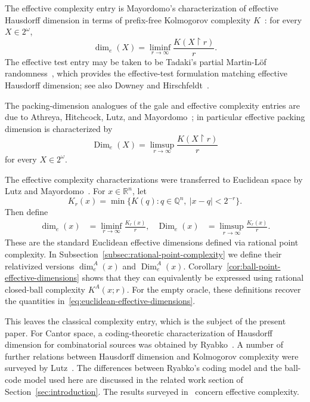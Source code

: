 \documentclass[a4paper,oneside,reqno,12pt]{amsart}
\theoremstyle{plain}
\theoremstyle{definition}
\theoremstyle{remark}
\DeclareMathOperator{\Dim}{Dim}
\begin{document}
The
effective complexity entry is Mayordomo's characterization of effective
Hausdorff dimension in terms of prefix-free Kolmogorov complexity \(K\)~\cite{Mayordomo2002}:
for every \(X\in2^\omega\),
\[
\dim_e(X)
=
\liminf_{r\to\infty}\frac{K(X\upharpoonright r)}{r}.
\]
The effective test entry may be taken to be Tadaki's partial Martin-L\"of
randomness~\cite{Tadaki2002}, which provides the effective-test formulation
matching effective Hausdorff dimension; see also Downey and
Hirschfeldt~\cite[Proposition~13.5.3]{DowneyHirschfeldt2010}.

The
packing-dimension analogues of the gale and effective complexity entries are
due to Athreya, Hitchcock, Lutz, and
Mayordomo~\cite{AthreyaHitchcockLutzMayordomo2007}; in particular effective
packing dimension is characterized by
\[
\Dim_e(X)
=
\limsup_{r\to\infty}\frac{K(X\upharpoonright r)}{r}
\]
for every \(X\in2^\omega\).
 
The effective complexity characterizations were transferred to Euclidean
space by Lutz and Mayordomo~\cite{LutzMayordomo2008}.  For
\(x\in\mathbb R^n\), let
\begin{equation}
\label{eq:euclidean-point-complexity}
K_r(x)
=
\min\{K(q):q\in\mathbb Q^n,\ |x-q|<2^{-r}\}.
\end{equation}
Then define
\begin{equation}
\label{eq:euclidean-effective-dimensions}
\begin{aligned}
\dim_e(x)
&=
\liminf_{r\to\infty}
\frac{K_r(x)}{r},
&
\Dim_e(x)
&=
\limsup_{r\to\infty}
\frac{K_r(x)}{r}.
\end{aligned}
\end{equation}
These are the standard Euclidean effective dimensions defined via rational
point complexity.  In Subsection~\ref{subsec:rational-point-complexity} we
define their relativized versions \(\dim_e^A(x)\) and \(\Dim_e^A(x)\).
Corollary~\ref{cor:ball-point-effective-dimensions} shows that they can
equivalently be expressed using rational closed-ball complexity \(K^A(x;r)\).
For the empty oracle, these definitions recover the quantities
in~\eqref{eq:euclidean-effective-dimensions}.

This leaves the classical complexity entry, which is the subject of the
present paper.  For Cantor space, a coding-theoretic characterization of
Hausdorff dimension for combinatorial sources was obtained by
Ryabko~\cite{Ryabko1986}.
A number of further relations between Hausdorff
dimension and Kolmogorov complexity were surveyed by
Lutz~\cite[Section~6]{Lutz2003b}.
The differences between Ryabko's coding model and
the ball-code model used here
are discussed in the related work section of Section~\ref{sec:introduction}.
The results surveyed in~\cite[Section~6]{Lutz2003b}
concern effective complexity.
 
\end{document}
